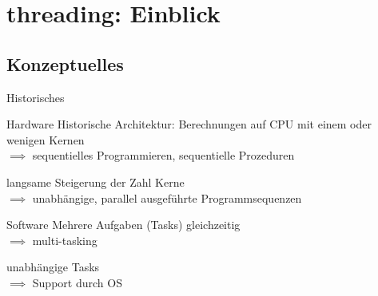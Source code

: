 \section{threading: Einblick}

\subsection{Konzeptuelles}

\begin{frame}{Historisches}
	\begin{block}{Hardware}
		Historische Architektur: Berechnungen auf CPU mit einem oder wenigen Kernen \\
		$\implies$ sequentielles Programmieren, sequentielle Prozeduren
		
		\vspace{1em}
		
		langsame Steigerung der Zahl Kerne \\
		$\implies$ unabhängige, parallel ausgeführte Programmsequenzen
	\end{block}
	
	\pause
	\vspace{1em}
	
	\begin{block}{Software}
		Mehrere Aufgaben (Tasks) gleichzeitig \\
		$\implies$ multi-tasking
		
		\vspace{1em}
		
		unabhängige Tasks \\
		$\implies$ Support durch OS
	\end{block}
\end{frame}


